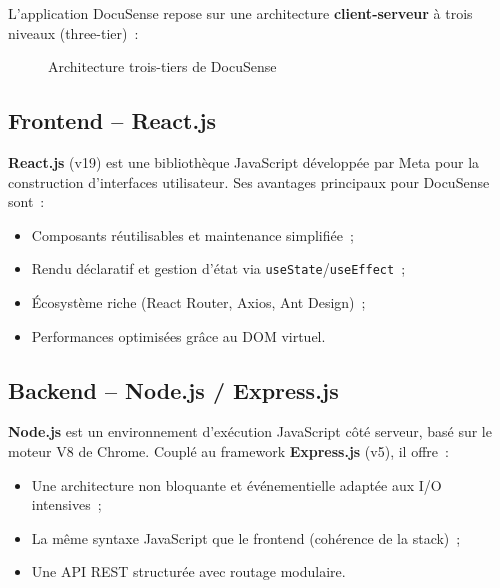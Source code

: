 \documentclass[12pt, a4paper, twoside, openany]{report}
\begin{document}
L'application DocuSense repose sur une architecture \textbf{client-serveur}
\`a trois niveaux (three-tier)~:

\begin{figure}[H]
  \centering
  \caption{Architecture trois-tiers de DocuSense}
  \label{fig:architecture-globale}
\end{figure}

\subsection{Frontend -- React.js}

\textbf{React.js} (v19) est une biblioth\`eque JavaScript d\'evelopp\'ee par Meta
pour la construction d'interfaces utilisateur. Ses avantages principaux pour
DocuSense sont~:
\begin{itemize}
  \item Composants r\'eutilisables et maintenance simplifi\'ee~;
  \item Rendu d\'eclaratif et gestion d'\'etat via \texttt{useState}/\texttt{useEffect}~;
  \item \'Ecosyst\`eme riche (React Router, Axios, Ant Design)~;
  \item Performances optimis\'ees gr\^ace au DOM virtuel.
\end{itemize}

\subsection{Backend -- Node.js / Express.js}

\textbf{Node.js} est un environnement d'ex\'ecution JavaScript c\^ot\'e serveur,
bas\'e sur le moteur V8 de Chrome. Coupl\'e au framework \textbf{Express.js} (v5),
il offre~:
\begin{itemize}
  \item Une architecture non bloquante et \'ev\'enementielle adapt\'ee aux I/O
        intensives~;
  \item La m\^eme syntaxe JavaScript que le frontend (coh\'erence de la stack)~;
  \item Une API REST structur\'ee avec routage modulaire.
\end{itemize}
\end{document}

